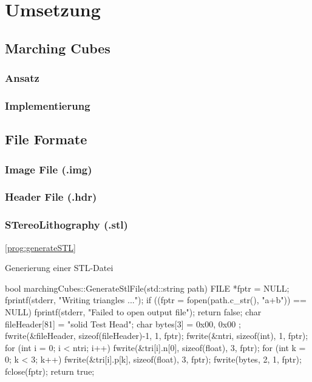 \chapter{Umsetzung}

\section{Marching Cubes}

\subsection{Ansatz}

\subsection{Implementierung}

\section{File Formate}

\subsection{Image File (.img)}

\subsection{Header File (.hdr)}

\subsection{STereoLithography (.stl)}
\ref{prog:generateSTL}


\begin{program}
	\caption{Generierung einer STL-Datei}
	\label{prog:generateSTL}
	\begin{CCode}
	bool marchingCubes::GenerateStlFile(std::string path){
		FILE *fptr = NULL;
		fprintf(stderr, "Writing triangles ...\n");
		if ((fptr = fopen(path.c_str(), "a+b")) == NULL) {
			fprintf(stderr, "Failed to open output file\n");
			return false;
		}
		char fileHeader[81] = "solid Test Head";
		char bytes[3] = { 0x00, 0x00 };
		fwrite(&fileHeader, sizeof(fileHeader)-1, 1, fptr);
		fwrite(&ntri, sizeof(int), 1, fptr);
		for (int i = 0; i < ntri; i++) {
			fwrite(&tri[i].n[0], sizeof(float), 3, fptr);
			for (int k = 0; k < 3; k++)  {
				fwrite(&tri[i].p[k], sizeof(float), 3, fptr);
			}
			fwrite(bytes, 2, 1, fptr);
		}
		fclose(fptr);
		return true;
	}
	\end{CCode}
\end{program}

